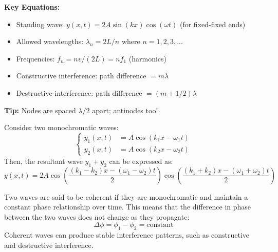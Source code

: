 \documentclass[11pt]{report}
\begin{document}
\begin{keybox}
\textbf{Key Equations:}
\begin{itemize}
    \item Standing wave: $y(x,t) = 2A\sin(kx)\cos(\omega t)$ (for fixed-fixed ends)
    \item Allowed wavelengths: $\lambda_n = 2L/n$ where $n = 1,2,3,...$
    \item Frequencies: $f_n = nv/(2L) = nf_1$ (harmonics)
    \item Constructive interference: path difference $= m\lambda$
    \item Destructive interference: path difference $= (m+1/2)\lambda$
\end{itemize}
\textbf{Tip:} Nodes are spaced $\lambda/2$ apart; antinodes too!
\end{keybox}
\begin{definition}
    Consider two monochromatic waves:
    $$
    \begin{cases}
        y_1(x,t) &= A \cos(k_1 x - \omega_1 t) \\
        y_2(x,t) &= A \cos(k_2 x - \omega_2 t)
    \end{cases}
    $$
    Then, the resultant wave $y_1 + y_2$ can be expressed as:
    $$
        y(x,t) = 2A \cos\left(\frac{(k_1 - k_2)x - (\omega_1 - \omega_2)t}{2}\right) \cos\left(\frac{(k_1 + k_2)x - (\omega_1 + \omega_2)t}{2}\right)
    $$
\end{definition}

\begin{definition}[Coherence]
    Two waves are said to be coherent if they are monochromatic and maintain a constant phase relationship over time. This means that the difference in phase between the two waves does not change as they propagate:
    $$
        \Delta \phi = \phi_1 - \phi_2 = \text{constant}
    $$
    Coherent waves can produce stable interference patterns, such as constructive and destructive interference.
\end{definition}
\end{document}
